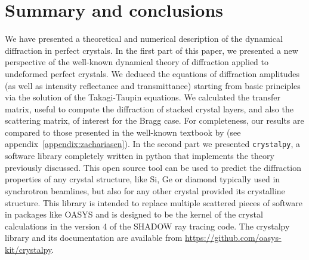 \documentclass{iucr}
\newcommand{\todo}[1]{{\color{red}[TODO: "#1'']}}
\begin{document}


%
\section{Summary and conclusions}
\label{sec:summary}

We have presented a theoretical and numerical description of the dynamical diffraction in perfect crystals. In the first part of this paper, we presented a new perspective of the well-known dynamical theory of diffraction applied to undeformed perfect crystals. We deduced the equations of diffraction amplitudes (as well as intensity reflectance and transmittance) starting from basic principles via the solution of the Takagi-Taupin equations. We calculated the transfer matrix, useful to compute the diffraction of stacked crystal layers, and also the scattering matrix, of interest for the Bragg case. For completeness, our results are compared to those presented in the well-known textbook by \cite{ZachariasenBook} (see appendix~\ref{appendix:zachariasen}).
In the second part we presented {\tt crystalpy}, a software library completely written in python that implements the theory previously discussed. This open source tool can be used to predict the diffraction properties of any crystal structure, like Si, Ge or diamond typically used in synchrotron beamlines, but also for any other crystal provided its crystalline structure. This library is intended to replace multiple scattered pieces of software in packages like OASYS \cite{codeOASYS} and is designed to be the kernel of the crystal calculations in the version 4 of the SHADOW \cite{codeSHADOW} ray tracing code. The crystalpy library and its documentation are available from \url{https://github.com/oasys-kit/crystalpy}. 
\end{document}
